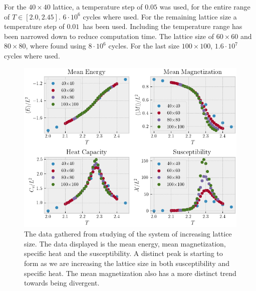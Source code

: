 \documentclass[%
reprint,
nofootinbib,
amsmath,amssymb,
aps,
]{revtex4-1}
\begin{document}
For the $40\times 40$ lattice, a temperature step of $0.05$ was used, for the entire range of $T \in [2.0, 2.45]$. $6\cdot 10^6$ cycles where used. 
For the remaining lattice size a temperature step of $0.01$ has been used. Including the temperature range has been narrowed down to reduce computation time. 
The lattice size of $60\times 60$ and $80\times 80$, where found using $8\cdot 10^6$ cycles.
For the last size $100\times 100$, $1.6\cdot 10^7$ cycles where used. 

\begin{figure}
	\centering
	\includegraphics[scale=1]{./figures/LatticeSize.png}
	\caption{The data gathered from studying of the system of increasing lattice size. The data displayed is the mean energy, mean magnetization, specific heat and the susceptibility. A distinct peak is starting to form as we are increasing the lattice size in both susceptibility and specific heat. The mean magnetization also has a more distinct trend towards being divergent.}
	\label{fig:LatticeSize}
\end{figure}
\end{document}
